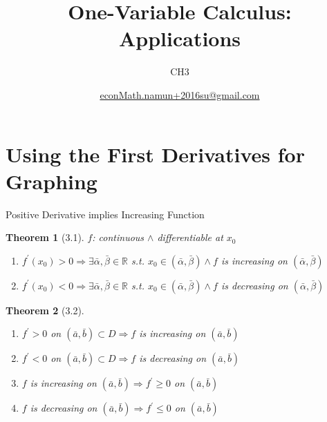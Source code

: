 \documentclass[a4paper,11pt]{article}
\author[조남운]{\url{econMath.namun+2016su@gmail.com}}
\title{One-Variable Calculus: Applications}
\subtitle{CH3}
\newtheorem{thm}{Theorem}
\begin{document}
	\maketitle


\section{Using the First Derivatives for Graphing} %
\label{sec:using_the_first_derivative_for_graphing}

\begin{frame}[t]{Positive Derivative implies Increasing Function}
	\begin{thm}[3.1]
		$f$: continuous $\land$ differentiable at $x_0$
		\begin{enumerate}
			\item $f^\prime (x_0)>0 \Rightarrow \exists \bar\alpha,\bar\beta\in\mathbb{R} $ s.t. $x_0\in(\bar\alpha,\bar\beta)\land f$ is increasing on $(\bar\alpha,\bar\beta)$
			\item $f^\prime (x_0)<0 \Rightarrow \exists \bar\alpha,\bar\beta\in\mathbb{R} $ s.t. $x_0\in(\bar\alpha,\bar\beta)\land f$ is decreasing on $(\bar\alpha,\bar\beta)$
		\end{enumerate}
	\end{thm}
	\begin{thm}
		[3.2]
		\begin{enumerate}
			\item $f^\prime>0$ on $(\bar a, \bar b)\subset D \Rightarrow f$ is increasing on $(\bar a,\bar b)$
			\item $f^\prime<0$ on $(\bar a, \bar b)\subset D \Rightarrow f$ is decreasing on $(\bar a,\bar b)$
			\item $f$ is increasing on $(\bar a, \bar b) \Rightarrow f^\prime \ge 0$ on $(\bar a, \bar b)$
			\item $f$ is decreasing on $(\bar a, \bar b) \Rightarrow f^\prime \le 0$ on $(\bar a, \bar b)$
		\end{enumerate}
	\end{thm}
\end{frame}
\end{document}
